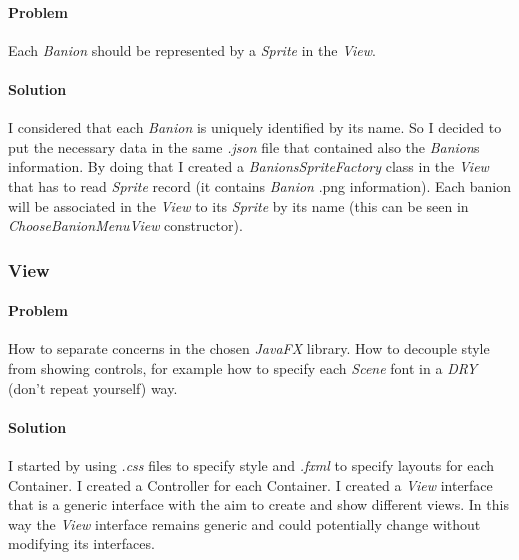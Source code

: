 \documentclass[12pt, a4paper]{report}
\theoremstyle{definition}
\begin{document}
            \paragraph{Problem}

            Each \emph{Banion} should be represented by a \emph{Sprite} in the \emph{View}.

            \paragraph{Solution}

            I considered that each \emph{Banion} is uniquely identified by its name.
            So I decided to put the necessary data in the same \textit{.json} file that contained also the \emph{Banion}s information.
            By doing that I created a \emph{BanionsSpriteFactory} class in the \emph{View} that has to read \emph{Sprite} record (it contains \emph{Banion} .png information).
            Each banion will be associated in the \emph{View} to its \emph{Sprite} by its name (this can be seen in \emph{ChooseBanionMenuView} constructor).

        \subsubsection{View}

            \paragraph{Problem}

            How to separate concerns in the chosen \emph{JavaFX} library.
            How to decouple style from showing controls, for example how to specify each \emph{Scene} font in a \emph{DRY} (don't repeat yourself) way.

            \paragraph{Solution}

            I started by using \textit{.css} files to specify style and \textit{.fxml} to specify layouts for each Container.
            I created a Controller for each Container.
            I created a \textit{View} interface that is a generic interface with the aim to create and show different views.
            In this way the \textit{View} interface remains generic and could potentially change without modifying its interfaces.
\end{document}
